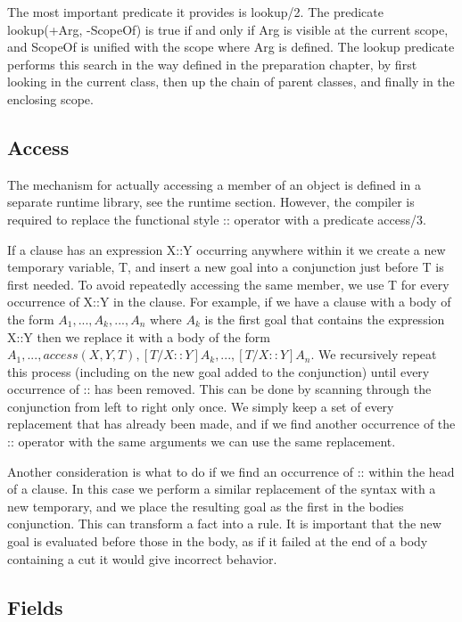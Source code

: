 \documentclass[12pt,a4paper,twoside,openright]{report}
\begin{document}
\bigskip

The most important predicate it provides is lookup/2. The predicate lookup(+Arg, -ScopeOf) is true if and only if Arg is visible at the current scope, and ScopeOf is unified with the scope where Arg is defined. The lookup predicate performs this search in the way defined in the preparation chapter, by first looking in the current class, then up the chain of parent classes, and finally in the enclosing scope.

\subsection{Access}

The mechanism for actually accessing a member of an object is defined in a separate runtime library, see the runtime section. However, the compiler is required to replace the functional style :: operator with a predicate access/3. 

\bigskip

If a clause has an expression X::Y occurring anywhere within it we create a new temporary variable, T, and insert a new goal into a conjunction just before T is first needed. To avoid repeatedly accessing the same member, we use T for every occurrence of X::Y in the clause. For example, if we have a clause with a body of the form $A_1, ..., A_k, ..., A_n$ where $A_k$ is the first goal that contains the expression X::Y then we replace it with a body of the form $A_1, ..., access(X, Y, T), [T/X::Y]A_k, ..., [T/X::Y]A_n$. We recursively repeat this process (including on the new goal added to the conjunction) until every occurrence of :: has been removed. This can be done by scanning through the conjunction from left to right only once. We simply keep a set of every replacement that has already been made, and if we find another occurrence of the :: operator with the same arguments we can use the same replacement.

\bigskip

Another consideration is what to do if we find an occurrence of :: within the head of a clause. In this case we perform a similar replacement of the syntax with a new temporary, and we place the resulting goal as the first in the bodies conjunction. This can transform a fact into a rule. It is important that the new goal is evaluated before those in the body, as if it failed at the end of a body containing a cut it would give incorrect behavior.

\subsection{Fields}
\end{document}

